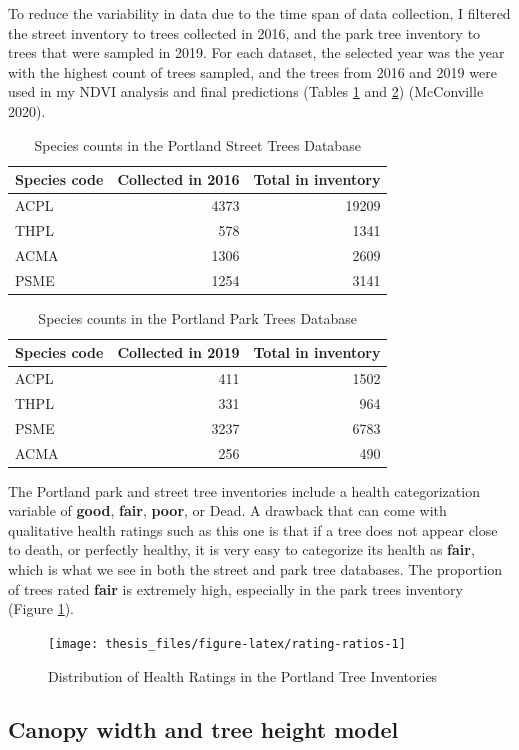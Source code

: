 \documentclass[12pt,twoside]{reedthesis}
\begin{document}
To reduce the variability in data due to the time span of data
collection, I filtered the street inventory to trees collected in 2016,
and the park tree inventory to trees that were sampled in 2019. For each
dataset, the selected year was the year with the highest count of trees
sampled, and the trees from 2016 and 2019 were used in my NDVI analysis
and final predictions (Tables \ref{tab:streettable} and
\ref{tab:parktable}) (McConville 2020).
\begin{table}

\caption[Species counts in Street Trees Database]{\label{tab:streettable}Species counts in the Portland Street Trees Database}
\centering
\begin{tabular}[t]{lrr}
\toprule
Species code & Collected in 2016 & Total in inventory\\
\midrule
ACPL & 4373 & 19209\\
THPL & 578 & 1341\\
ACMA & 1306 & 2609\\
PSME & 1254 & 3141\\
\bottomrule
\end{tabular}
\end{table}
\begin{table}

\caption[Species counts in Park Trees Database]{\label{tab:parktable}Species counts in the Portland Park Trees Database}
\centering
\begin{tabular}[t]{lrr}
\toprule
Species code & Collected in 2019 & Total in inventory\\
\midrule
ACPL & 411 & 1502\\
THPL & 331 & 964\\
PSME & 3237 & 6783\\
ACMA & 256 & 490\\
\bottomrule
\end{tabular}
\end{table}
The Portland park and street tree inventories include a health
categorization variable of \textbf{good}, \textbf{fair}, \textbf{poor}, or Dead. A
drawback that can come with qualitative health ratings such as this one
is that if a tree does not appear close to death, or perfectly healthy,
it is very easy to categorize its health as \textbf{fair}, which is what we
see in both the street and park tree databases. The proportion of trees
rated \textbf{fair} is extremely high, especially in the park trees inventory
(Figure \ref{fig:rating-ratios}).
\begin{figure}[H]

{\centering \texttt{[image: thesis\_files/figure-latex/rating-ratios-1]} 

}

\caption{Distribution of Health Ratings in the Portland Tree Inventories}\label{fig:rating-ratios}
\end{figure}
\hypertarget{canopy-width-and-tree-height-model}{%
\subsection{Canopy width and tree height model}\label{canopy-width-and-tree-height-model}}
\end{document}
